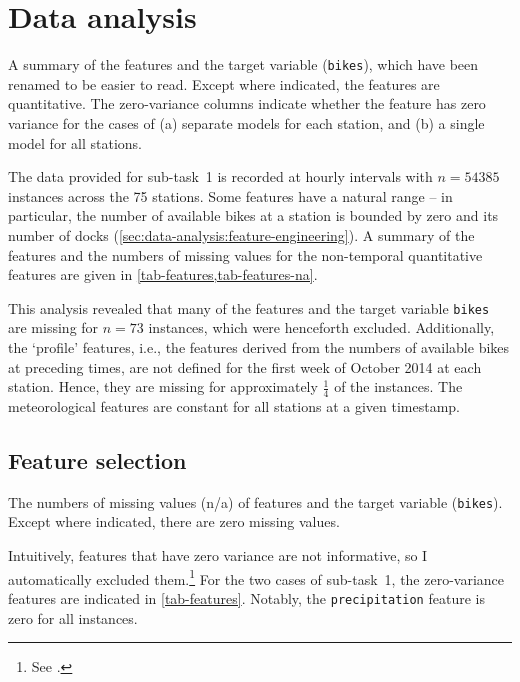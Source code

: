 \section{Data analysis}
\label{sec:data-analysis}

\begin{table}
	\centering
	
	\caption{
		A summary of the features and the target variable (\texttt{bikes}), which have been renamed to be easier to read.
		Except where indicated, the features are quantitative.
		The zero-variance columns indicate whether the feature has zero variance for the cases
		of (a) separate models for each station, and (b) a single model for all stations.
	}
	\label{tab-features}
\end{table}

The data provided for sub-task~1 is recorded at hourly intervals with $n = 54385$
instances across the 75 stations.
Some features have a natural range -- in particular, the number of available bikes at a
station is bounded by zero and its number of docks
(\cref{sec:data-analysis:feature-engineering}).
A summary of the features and the numbers of missing values for the non-temporal
quantitative features are given in \cref{tab-features,tab-features-na}.

This analysis revealed that many of the features and the target variable \texttt{bikes}
are missing for $n = 73$ instances, which were henceforth excluded.
Additionally, the `profile' features, i.e., the features derived from the numbers of
available bikes at preceding times, are not defined for the first week of October 2014
at each station.
Hence, they are missing for approximately $\frac{1}{4}$ of the instances.
The meteorological features are constant for all stations at a given timestamp.

\subsection{Feature selection}
\label{sec:data-analysis:feature-selection}

\begin{table}
	\centering
	
	\caption{
		The numbers of missing values (n/a) of features and the target variable (\texttt{bikes}).
		Except where indicated, there are zero missing values.
	}
	\label{tab-features-na}
\end{table}

Intuitively, features that have zero variance are not informative, so I automatically
excluded them.\footnote{See .} For the
two cases of sub-task~1, the zero-variance features are indicated in
\cref{tab-features}.
Notably, the \texttt{precipitation} feature is zero for all instances.

